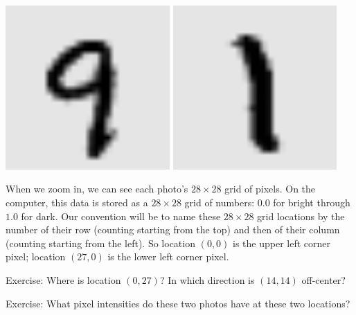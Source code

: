 \documentclass[11pt, justified]{tufte-book}
\newcommand{\attn}[1]{{\bro \textsf{#1}}}
\theoremstyle{definition}
\begin{document}
        \begin{marginfigure}
          \vspace{-3.5cm}
          \includegraphics[width=0.47\textwidth]{example-mnist/mnist-trn-00}%
            \hspace{0.03\textwidth}
          \includegraphics[width=0.47\textwidth]{example-mnist/mnist-trn-01}%
        \end{marginfigure}
        When we zoom in, we can see each photo's $28\times 28$ grid of pixels.
        On the computer, this data is stored as a $28\times 28$ grid of numbers:
        $0.0$ for bright through $1.0$ for dark.
        Our convention will be to name these $28\times28$ grid locations by the
        number of their row (counting starting from the top) and then of their
        column (counting starting from the left).  So location $(0,0)$ is the
        upper left corner pixel; location $(27,0)$ is the lower left corner
        pixel.
        \par\noindent
        \attn{Exercise:} {Where is location $(0,27)$?  %
        In which direction is $(14,14)$ off-center?}
        \par\noindent
        \attn{Exercise:} {What pixel intensities do these two photos have at these  %
        two locations?}
\end{document}
